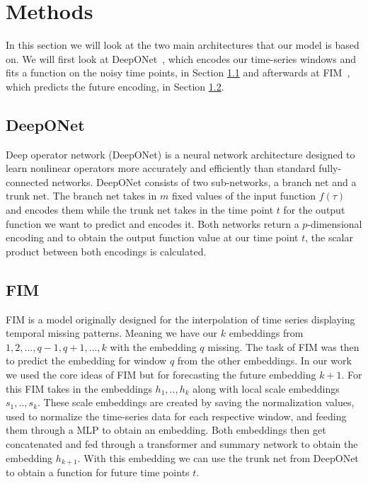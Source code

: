 \documentclass{article}
\theoremstyle{plain}
\theoremstyle{definition}
\theoremstyle{remark}
\begin{document}
\section{Methods}
In this section we will look at the two main architectures that our model is based on. We will first look at DeepONet~\cite{Deeponet}, which encodes our time-series windows and fits a function on the noisy time points, in Section \ref{sec:DeepONet} and afterwards at FIM~\cite{fim-l}, which predicts the future encoding, in Section \ref{sec:FIM_arwin}.

\subsection{DeepONet}\label{sec:DeepONet}
Deep operator network (DeepONet)\cite{Deeponet} is a neural network architecture designed to learn nonlinear operators more accurately and efficiently than standard fully-connected networks. DeepONet consists of two sub-networks, a branch net and a trunk net. The branch net takes in $m$ fixed values of the input function $f(\tau)$ and encodes them while the trunk net takes in the time point $t$ for the output function we want to predict and encodes it. Both networks return a $p$-dimensional encoding and to obtain the output function value at our time point $t$, the scalar product between both encodings is calculated.


\subsection{FIM}\label{sec:FIM_arwin}
FIM\cite{fim-l} is a model originally designed for the interpolation of time series displaying temporal missing patterns. Meaning we have our $k$ embeddings from $1, 2, ..., q-1, q+1, ..., k$ with the embedding $q$ missing. The task of FIM was then to predict the embedding for window $q$ from the other embeddings. In our work we used the core ideas of FIM but for forecasting the future embedding $k+1$. For this FIM takes in the embeddings $h_1, .., h_k$ along with local scale embeddings $s_1, .., s_k$. These scale embeddings are created by saving the normalization values, used to normalize the time-series data for each respective window, and feeding them through a MLP to obtain an embedding. Both embeddings then get concatenated and fed through a transformer and summary network to obtain the embedding $h_{k+1}$. With this embedding we can use the trunk net from DeepONet to obtain a function for future time points $t$.
\end{document}
